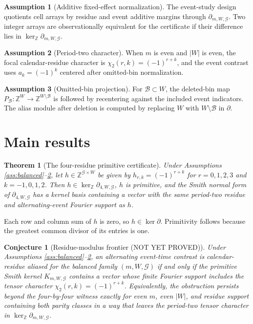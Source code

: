 \documentclass[11pt]{article}
\theoremstyle{definition}
\newtheorem{assumption}{Assumption}
\theoremstyle{plain}
\newtheorem{theorem}{Theorem}
\newtheorem{conjecture}{Conjecture}
\theoremstyle{remark}
\begin{document}
\begin{assumption}[Additive fixed-effect normalization]\label{ass:additive}
The event-study design quotients cell arrays by residue and event additive margins through \(\partial_{m,W,\mathcal G}\). Two integer arrays are observationally equivalent for the certificate if their difference lies in \(\ker_{\mathbb Z}\partial_{m,W,\mathcal G}\).
\end{assumption}

\begin{assumption}[Period-two character]\label{ass:periodtwo}
When \(m\) is even and \(|W|\) is even, the focal calendar-residue character is \(\chi_2(r,k)=(-1)^{r+k}\), and the event contrast uses \(a_k=(-1)^k\) centered after omitted-bin normalization.
\end{assumption}

\begin{assumption}[Omitted-bin projection]\label{ass:omit}
For \(\mathcal B\subset W\), the deleted-bin map \(P_{\mathcal B}:\mathbb Z^W\to\mathbb Z^{W\setminus\mathcal B}\) is followed by recentering against the included event indicators. The alias module after deletion is computed by replacing \(W\) with \(W\setminus\mathcal B\) in \(\partial\).
\end{assumption}

\section{Main results}
\begin{theorem}[The four-residue primitive certificate]\label{thm:four}
Under Assumptions \ref{ass:balanced}--\ref{ass:periodtwo}, let \(h\in\mathbb Z^{\mathcal G\times W}\) be given by \(h_{r,k}=(-1)^{r+k}\) for \(r=0,1,2,3\) and \(k=-1,0,1,2\). Then \(h\in\ker_{\mathbb Z}\partial_{4,W,\mathcal G}\), \(h\) is primitive, and the Smith normal form of \(\partial_{4,W,\mathcal G}\) has a kernel basis containing a vector with the same period-two residue and alternating-event Fourier support as \(h\).
\end{theorem}
Each row and column sum of \(h\) is zero, so \(h\in\ker\partial\). Primitivity follows because the greatest common divisor of its entries is one.

\begin{conjecture}[Residue-modulus frontier (NOT YET PROVED)]\label{conj:frontier}
Under Assumptions \ref{ass:balanced}--\ref{ass:periodtwo}, an alternating event-time contrast is calendar-residue aliased for the balanced family \((m,W,\mathcal G)\) if and only if the primitive Smith kernel \(K_{m,W,\mathcal G}\) contains a vector whose finite Fourier support includes the tensor character \(\chi_2(r,k)=(-1)^{r+k}\). Equivalently, the obstruction persists beyond the four-by-four witness exactly for even \(m\), even \(|W|\), and residue support containing both parity classes in a way that leaves the period-two tensor character in \(\ker_{\mathbb Z}\partial_{m,W,\mathcal G}\).
\end{conjecture}
\end{document}

